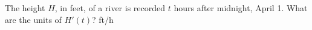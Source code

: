 {The height $H$, in feet, of a river is recorded $t$ hours after midnight, April 1. What are the units of $H'(t)$?
}
{ft/h
}
